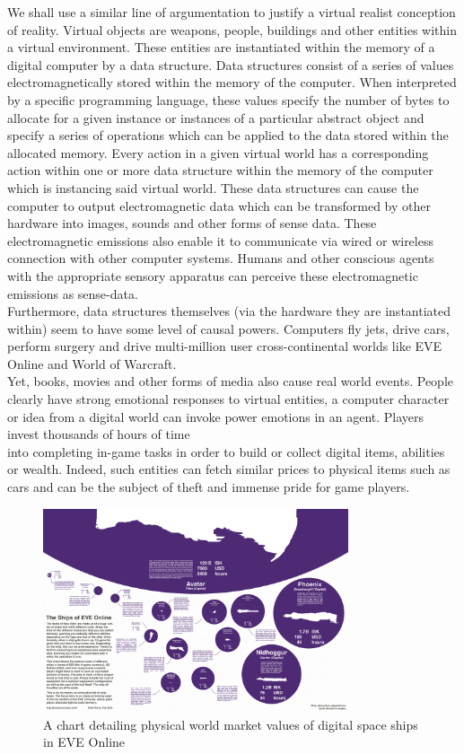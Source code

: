  We shall use a similar line of argumentation to justify a virtual realist conception of reality. Virtual objects are weapons, people, buildings and other entities within a virtual environment. These entities are instantiated within the memory of a digital computer by a data structure. Data structures consist of a series of values electromagnetically stored within the memory of the computer. When interpreted by a specific programming language, these values specify the number of bytes to allocate for a given instance or instances of a particular abstract object and specify a series of operations which can be applied to the data stored within the allocated memory. Every action in a given virtual world has a corresponding action within one or more data structure within the memory of the computer which is instancing said virtual world. These data structures can cause the computer to output electromagnetic data which can be transformed by other hardware into images, sounds and other forms of sense data. These electromagnetic emissions also enable it to communicate via wired or wireless connection with other computer systems. Humans and other conscious agents with the appropriate sensory apparatus can perceive these electromagnetic emissions as sense-data.
 \\
 
  Furthermore, data structures themselves (via the hardware they are instantiated within) seem to have some level of causal powers. Computers fly jets, drive cars, perform surgery and drive multi-million user cross-continental worlds like EVE Online and World of Warcraft. \\
  Yet, books, movies and other forms of media also cause real world events. People clearly have strong emotional responses to virtual entities, a computer character or idea from a digital world can invoke power emotions in an agent. Players invest thousands of hours of time \\
  into completing in-game tasks in order to build or collect digital items, abilities or wealth. Indeed, such entities can fetch similar prices to physical items such as cars and can be the subject of theft and immense pride for game players. \cite{EVEArticle}
   

  
  \begin{figure}[ht!]
  	\centering
  	\includegraphics[width=90mm]{4339410221_12d667f5b1_o.png}
  	\caption{A chart detailing physical world market values of digital space ships in EVE Online \label{overflow}}
  	\label{fig:FF7}
  \end{figure}
  	
